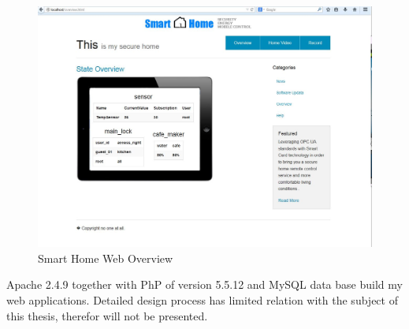 \begin{figure}[!htb]
	\centering
	\includegraphics[width=1\textwidth]{Images/design/overview.jpg}
		\caption{Smart Home Web Overview}
	\label{fig:smart-home-frontpage}
\end{figure}
Apache 2.4.9 together with PhP of version 5.5.12 and MySQL data base build my web applications.  Detailed design process has limited relation with the subject of this thesis, therefor will not be presented.